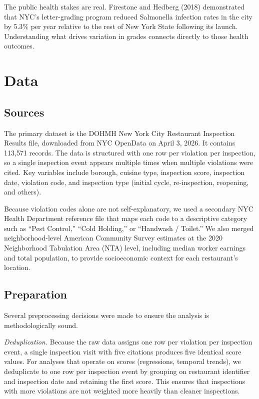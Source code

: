 \documentclass[11pt, twocolumn]{article}
\begin{document}
The public health stakes are real. Firestone and Hedberg (2018)
demonstrated that NYC's letter-grading program reduced Salmonella
infection rates in the city by 5.3\% per year relative to the rest of
New York State following its launch. Understanding what drives variation
in grades connects directly to those health outcomes.

\section{Data}

\subsection{Sources}

The primary dataset is the DOHMH New York City Restaurant Inspection
Results file, downloaded from NYC OpenData on April 3, 2026. It contains
113,571 records. The data is structured with one row per violation per
inspection, so a single inspection event appears multiple times when
multiple violations were cited. Key variables include borough, cuisine
type, inspection score, inspection date, violation code, and inspection
type (initial cycle, re-inspection, reopening, and others).

Because violation codes alone are not self-explanatory, we used a
secondary NYC Health Department reference file that maps each code to a
descriptive category such as ``Pest Control,'' ``Cold Holding,'' or
``Handwash / Toilet.'' We also merged neighborhood-level American
Community Survey estimates at the 2020 Neighborhood Tabulation Area (NTA)
level, including median worker earnings and total population, to provide
socioeconomic context for each restaurant's location.

\subsection{Preparation}

Several preprocessing decisions were made to ensure the analysis is
methodologically sound.

\textit{Deduplication.} Because the raw data assigns one row per violation
per inspection event, a single inspection visit with five citations
produces five identical score values. For analyses that operate on scores
(regressions, temporal trends), we deduplicate to one row per
inspection event by grouping on restaurant identifier and inspection date
and retaining the first score. This ensures that inspections with more
violations are not weighted more heavily than cleaner inspections.
\end{document}
